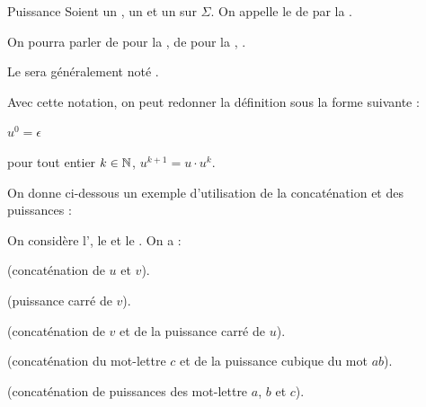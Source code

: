 \documentclass[a4paper,french,bookmarks]{book}
\begin{document}
    \begin{definition}{Puissance}{}
        Soient \hg{$\Sigma$} un ,  un  et  un  sur $\Sigma$. On appelle  le  de  par la .\medskip
        
        On pourra parler de  pour la , de  pour la , \etc.
    \end{definition}
    \begin{notation}
        Le  sera généralement noté .
    \end{notation}
    
    Avec cette notation, on peut redonner la définition sous la forme suivante :
    \begin{enumerate}
        \begin{minipage}{0.5\linewidth}
            \itt $u^0 = \epsilon$
        \end{minipage}
        \begin{minipage}{0.5\linewidth}
            \itt pour tout entier $k \in \mathbb{N}$, $u^{k+1} = u \cdot u^k$.
        \end{minipage}
    \end{enumerate}
    
    On donne ci-dessous un exemple d'utilisation de la concaténation et des puissances :
    
    \begin{example}{}{}
        On considère l', le  et le . On a :
        \begin{enumerate}
            \itt {} (concaténation de $u$ et $v$).
            
            \itt {} (puissance carré de $v$).
            
            \itt {} (concaténation de $v$ et de la puissance carré de $u$).
            
            \itt {} (concaténation du mot-lettre $c$ et de la puissance cubique du mot $ab$).
            
            \itt {} (concaténation de puissances des mot-lettre $a$, $b$ et $c$).
        \end{enumerate}
    \end{example}
    
\end{document}

